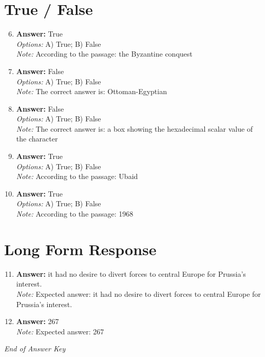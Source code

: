 \documentclass[12pt]{article}
\begin{document}
\section*{True / False}
\begin{enumerate}[label=\arabic*.]
\setcounter{enumi}{5}
\item \textbf{Answer:} True
\\ \textit{Options:} A) True; B) False
\\ \textit{Note:} According to the passage: the Byzantine conquest
\item \textbf{Answer:} False
\\ \textit{Options:} A) True; B) False
\\ \textit{Note:} The correct answer is: Ottoman-Egyptian
\item \textbf{Answer:} False
\\ \textit{Options:} A) True; B) False
\\ \textit{Note:} The correct answer is: a box showing the hexadecimal scalar value of the character
\item \textbf{Answer:} True
\\ \textit{Options:} A) True; B) False
\\ \textit{Note:} According to the passage: Ubaid
\item \textbf{Answer:} True
\\ \textit{Options:} A) True; B) False
\\ \textit{Note:} According to the passage: 1968
\end{enumerate}

\section*{Long Form Response}
\begin{enumerate}[label=\arabic*.]
\setcounter{enumi}{10}
\item \textbf{Answer:} it had no desire to divert forces to central Europe for Prussia's interest.
\\ \textit{Note:} Expected answer: it had no desire to divert forces to central Europe for Prussia's interest.
\item \textbf{Answer:} 267
\\ \textit{Note:} Expected answer: 267
\end{enumerate}

\vfill
\noindent\textit{End of Answer Key}
\end{document}
